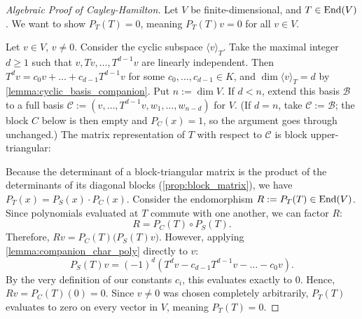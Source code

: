 \begin{proof}[Algebraic Proof of Cayley-Hamilton]
  Let $V$ be finite-dimensional, and $T \in \operatorname{End}(V)$. We want to show $P_T(T) = 0$, meaning $P_T(T)v = 0$ for all $v \in V$.

  Let $v \in V$, $v \neq 0$. Consider the cyclic subspace $\langle v \rangle_T$. Take the maximal integer $d \ge 1$ such that $v, Tv, \dots, T^{d-1}v$ are linearly independent. Then $T^d v = c_0 v + \dots + c_{d-1}T^{d-1}v$ for some $c_0, \dots, c_{d-1} \in K$, and $\dim \langle v \rangle_T = d$ by \cref{lemma:cyclic_basis_companion}.
  Put $n := \dim V$. If $d < n$, extend this basis $\mathcal{B}$ to a full basis $\mathcal{C} := (v, \dots, T^{d-1}v, w_1, \dots, w_{n-d})$ for $V$. (If $d = n$, take $\mathcal{C} := \mathcal{B}$; the block $C$ below is then empty and $P_C(x) = 1$, so the argument goes through unchanged.) The matrix representation of $T$ with respect to $\mathcal{C}$ is block upper-triangular:
  \begin{center}
  \end{center}
  Because the determinant of a block-triangular matrix is the product of the determinants of its diagonal blocks (\cref{prop:block_matrix}), we have $P_T(x) = P_S(x) \cdot P_C(x)$. Consider the endomorphism $R := P_T(T) \in \operatorname{End}(V)$. Since polynomials evaluated at $T$ commute with one another, we can factor $R$:
  \[
  R = P_C(T) \circ P_S(T).
  \]
  Therefore, $Rv = P_C(T) \Big( P_S(T)v \Big)$.
  However, applying \cref{lemma:companion_char_poly} directly to $v$:
  \[
  P_S(T)v = (-1)^d (T^d v - c_{d-1}T^{d-1}v - \dots - c_0 v).
  \]
  By the very definition of our constants $c_i$, this evaluates exactly to $0$. Hence, $Rv = P_C(T)(0) = 0$. Since $v \neq 0$ was chosen completely arbitrarily, $P_T(T)$ evaluates to zero on every vector in $V$, meaning $P_T(T) = 0$.
\end{proof}

